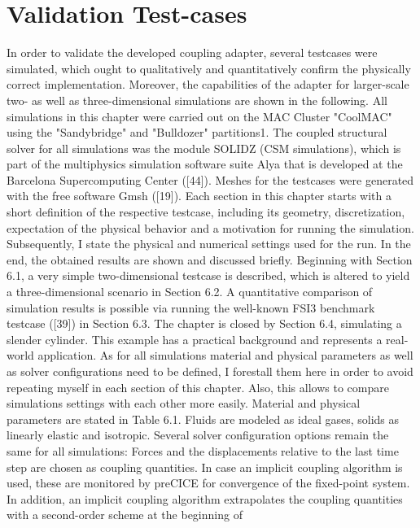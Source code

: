 \chapter{Validation Test-cases}
\label{cha:tests}

In order to validate the developed coupling adapter, several testcases were simulated, which ought to
qualitatively and quantitatively confirm the physically correct implementation. Moreover, the capabilities
of the adapter for larger-scale two- as well as three-dimensional simulations are shown in the following.
All simulations in this chapter were carried out on the MAC Cluster "CoolMAC" using the "Sandybridge"
and "Bulldozer" partitions1. The coupled structural solver for all simulations was the module SOLIDZ
(CSM simulations), which is part of the multiphysics simulation software suite Alya that is developed
at the Barcelona Supercomputing Center ([44]). Meshes for the testcases were generated with the free
software Gmsh ([19]).
Each section in this chapter starts with a short definition of the respective testcase, including its geometry,
discretization, expectation of the physical behavior and a motivation for running the simulation.
Subsequently, I state the physical and numerical settings used for the run. In the end, the obtained
results are shown and discussed briefly.
Beginning with Section 6.1, a very simple two-dimensional testcase is described, which is altered to yield a
three-dimensional scenario in Section 6.2. A quantitative comparison of simulation results is possible via
running the well-known FSI3 benchmark testcase ([39]) in Section 6.3. The chapter is closed by Section
6.4, simulating a slender cylinder. This example has a practical background and represents a real-world
application.
As for all simulations material and physical parameters as well as solver configurations need to be defined,
I forestall them here in order to avoid repeating myself in each section of this chapter. Also, this allows
to compare simulations settings with each other more easily. Material and physical parameters are stated
in Table 6.1. Fluids are modeled as ideal gases, solids as linearly elastic and isotropic.
Several solver configuration options remain the same for all simulations: Forces and the displacements
relative to the last time step are chosen as coupling quantities. In case an implicit coupling algorithm is
used, these are monitored by preCICE for convergence of the fixed-point system. In addition, an implicit
coupling algorithm extrapolates the coupling quantities with a second-order scheme at the beginning of

